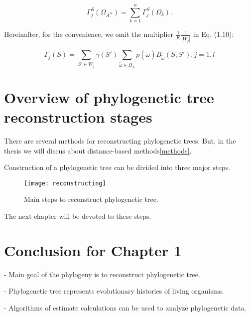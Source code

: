 \begin{equation*}
\Gamma_j^S(\Omega_{A^N}) = \sum_{k=1}^n \Gamma_j^S(\Omega_k). 
\end{equation*}

Hereinafter, for the convenience, we omit the multiplier 
$\frac{1}{K}\frac{1}{|W_j|}$ in Eq. (1.10):

\begin{equation}
\Gamma_j(S) = \sum_{S' \in W_j} \gamma(S') \sum_{\tilde{\omega} \in \Omega_A} p(\tilde{\omega}) B_{\tilde{\omega}}(S,S'), j = \bar{1,l}
\end{equation}

\section{Overview of phylogenetic tree reconstruction stages}
There are several methods for reconstructing phylogenetic trees.
But, in the thesis we will discus about distance-based methods\ref{methods}.

Construction of a phylogenetic tree can be divided 
into three major steps.

\begin{figure}[!htb] 
  \center
  \texttt{[image: reconstructing]}
  \caption[w]{Main steps to reconstruct phylogenetic tree.} 
  \label{img:rec1}  
\end{figure}

The next chapter will be devoted to these steps.

\section*{Conclusion for Chapter 1}

- Main goal of the phylogeny is to reconstruct 
phylogenetic tree.

- Phylogenetic tree represents evolutionary 
histories of living organisms.

- Algorithms of estimate calculations can be used to
analyze phylogenetic data.


\newpage